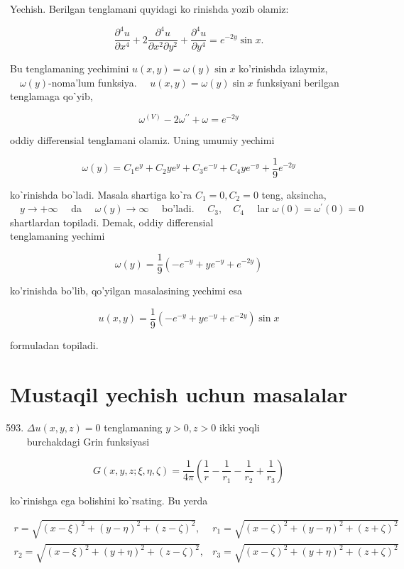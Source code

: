 \documentclass[10pt]{article}
\begin{document}
Yechish. Berilgan tenglamani quyidagi ko rinishda yozib olamiz:

$$
\frac{\partial^{4} u}{\partial x^{4}}+2 \frac{\partial^{4} u}{\partial x^{2} \partial y^{2}}+\frac{\partial^{4} u}{\partial y^{4}}=e^{-2 y} \sin x .
$$

Bu tenglamaning yechimini $u(x, y)=\omega(y) \sin x$ ko'rinishda izlaymiz, $\quad \omega(y)$-noma'lum funksiya. $\quad u(x, y)=\omega(y) \sin x$ funksiyani berilgan tenglamaga qoˋyib,

$$
\omega^{(V)}-2 \omega^{\prime \prime}+\omega=e^{-2 y}
$$

oddiy differensial tenglamani olamiz. Uning umumiy yechimi

$$
\omega(y)=C_{1} e^{y}+C_{2} y e^{y}+C_{3} e^{-y}+C_{4} y e^{-y}+\frac{1}{9} e^{-2 y}
$$

koˋrinishda boˋladi. Masala shartiga koˋra $C_{1}=0, C_{2}=0$ teng, aksincha, $\quad y \rightarrow+\infty \quad$ da $\quad \omega(y) \rightarrow \infty \quad$ bo'ladi. $\quad C_{3}, \quad C_{4} \quad$ lar $\omega(0)=\omega^{\prime}(0)=0$ shartlardan topiladi. Demak, oddiy differensial\\
tenglamaning yechimi

$$
\omega(y)=\frac{1}{9}\left(-e^{-y}+y e^{-y}+e^{-2 y}\right)
$$

ko'rinishda bo'lib, qo'yilgan masalasining yechimi esa

$$
u(x, y)=\frac{1}{9}\left(-e^{-y}+y e^{-y}+e^{-2 y}\right) \sin x
$$

formuladan topiladi.

\section*{Mustaqil yechish uchun masalalar}
\begin{enumerate}
  \setcounter{enumi}{592}
  \item $\Delta u(x, y, z)=0$ tenglamaning $y>0, z>0$ ikki yoqli\\
burchakdagi Grin funksiyasi
\end{enumerate}

$$
G(x, y, z ; \xi, \eta, \zeta)=\frac{1}{4 \pi}\left(\frac{1}{r}-\frac{1}{r_{1}}-\frac{1}{r_{2}}+\frac{1}{r_{3}}\right)
$$

koˋrinishga ega bolishini koˋrsating. Bu yerda

$$
\begin{array}{ll}
r=\sqrt{(x-\xi)^{2}+(y-\eta)^{2}+(z-\zeta)^{2}}, & r_{1}=\sqrt{(x-\zeta)^{2}+(y-\eta)^{2}+(z+\zeta)^{2}} \\
r_{2}=\sqrt{(x-\xi)^{2}+(y+\eta)^{2}+(z-\zeta)^{2}}, & r_{3}=\sqrt{(x-\zeta)^{2}+(y+\eta)^{2}+(z+\zeta)^{2}}
\end{array}
$$
\end{document}
